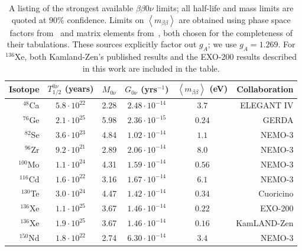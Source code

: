 \begin{enumerate}
\end{enumerate}

\begin{table}
\begin{center}
\begin{tabular}{|rccccr|}
\hline Isotope & $T_{1/2}^{0\nu}$ (years) & $M_{0\nu}$ & $G_{0\nu}$ (yrs${}^{-1}$) & $\left<m_{\beta\beta}\right>$ (eV) & Collaboration \\ \hline
$^{48}$Ca & $5.8 \cdot 10^{22}$ & 2.28 & $2.48 \cdot 10^{-14}$ & $3.7$ & ELEGANT IV \cite{ElegantIV}\\
$^{76}$Ge & $2.1 \cdot 10^{25}$ & 5.98 & $2.36 \cdot 10^{-15}$ & $0.24$ & GERDA \cite{PhysRevLett.111.122503} \\
$^{82}$Se & $3.6 \cdot 10^{23}$ & 4.84 & $1.02 \cdot 10^{-14}$ & $1.1$ & NEMO-3 \cite{NEMO2011RandomOtherIsotopes}\\
$^{96}$Zr & $9.2 \cdot 10^{21}$ & 2.89 & $2.06 \cdot 10^{-14}$ & $8.0$ & NEMO-3 \cite{Argyriades2010168}\\
$^{100}$Mo & $1.1 \cdot 10^{24}$ & 4.31 & $1.59 \cdot 10^{-14}$ & $0.56$ & NEMO-3 \cite{NEMO3-2013-100Mo}\\
$^{116}$Cd & $1.6 \cdot 10^{22}$ & 3.16 & $1.67 \cdot 10^{-14}$ & $6.1$ & NEMO-3 \cite{NEMO2011RandomOtherIsotopes}\\
$^{130}$Te & $3.0 \cdot 10^{24}$ & 4.47 & $1.42 \cdot 10^{-14}$ & $0.34$ & Cuoricino \cite{PhysRevC.78.035502}\\
$^{136}$Xe & $1.1 \cdot 10^{25}$ & 3.67 & $1.46 \cdot 10^{-14}$ & $0.22$ & EXO-200 \cite{NewEXObb0nPaper_2014}\\
$^{136}$Xe & $1.9 \cdot 10^{25}$ & 3.67 & $1.46 \cdot 10^{-14}$ & $0.16$ & KamLAND-Zen \cite{PhysRevLett.110.062502}\\
$^{150}$Nd & $1.8 \cdot 10^{22}$ & 2.74 & $6.30 \cdot 10^{-14}$ & $3.4$ & NEMO-3 \cite{PhysRevC.80.032501}\\
\hline
\end{tabular}
\end{center}
\caption{A listing of the strongest available $\beta\beta 0\nu$ limits; all half-life and mass limits are quoted at $90\%$ confidence.  Limits on $\left<m_{\beta\beta}\right>$ are obtained using phase space factors from~\cite{PhysRevC.85.034316} and matrix elements from~\cite{PhysRevLett.109.042501}, both chosen for the completeness of their tabulations.  These sources explicitly factor out $g_A$; we use $g_A = 1.269$.  For $^{136}$Xe, both Kamland-Zen's published results and the EXO-200 results described in this work are included in the table.}
\label{tab:0nubb_limits}
\end{table}

